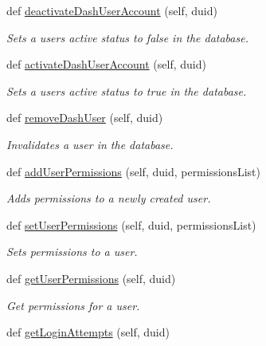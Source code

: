 \begin{DoxyCompactItemize}
def \hyperlink{classhandler_1_1dao_1_1user__dao_1_1_user_d_a_o_af9e5fda379f239935a78b40c95eee115}{deactivate\+Dash\+User\+Account} (self, duid)
\begin{DoxyCompactList}\small\item\em Sets a user\textquotesingle{}s active status to false in the database. \end{DoxyCompactList}\item 
def \hyperlink{classhandler_1_1dao_1_1user__dao_1_1_user_d_a_o_aa2dafcbc31416860bc4b64c2332c0f5c}{activate\+Dash\+User\+Account} (self, duid)
\begin{DoxyCompactList}\small\item\em Sets a user\textquotesingle{}s active status to true in the database. \end{DoxyCompactList}\item 
def \hyperlink{classhandler_1_1dao_1_1user__dao_1_1_user_d_a_o_a511ca5cdef0bc6e549c11e5f51dd831c}{remove\+Dash\+User} (self, duid)
\begin{DoxyCompactList}\small\item\em Invalidates a user in the database. \end{DoxyCompactList}\item 
def \hyperlink{classhandler_1_1dao_1_1user__dao_1_1_user_d_a_o_a33142b7d872005517261ea4e56b8e006}{add\+User\+Permissions} (self, duid, permissions\+List)
\begin{DoxyCompactList}\small\item\em Adds permissions to a newly created user. \end{DoxyCompactList}\item 
def \hyperlink{classhandler_1_1dao_1_1user__dao_1_1_user_d_a_o_a95abcb468f166ca40e8624e926c0f650}{set\+User\+Permissions} (self, duid, permissions\+List)
\begin{DoxyCompactList}\small\item\em Sets permissions to a user. \end{DoxyCompactList}\item 
def \hyperlink{classhandler_1_1dao_1_1user__dao_1_1_user_d_a_o_a7a17e7bf435c7b67263577d6da96bb47}{get\+User\+Permissions} (self, duid)
\begin{DoxyCompactList}\small\item\em Get permissions for a user. \end{DoxyCompactList}\item 
def \hyperlink{classhandler_1_1dao_1_1user__dao_1_1_user_d_a_o_ac9b514fe18ddd0270ccba0bdbe053da4}{get\+Login\+Attempts} (self, duid)

\end{DoxyCompactItemize}
